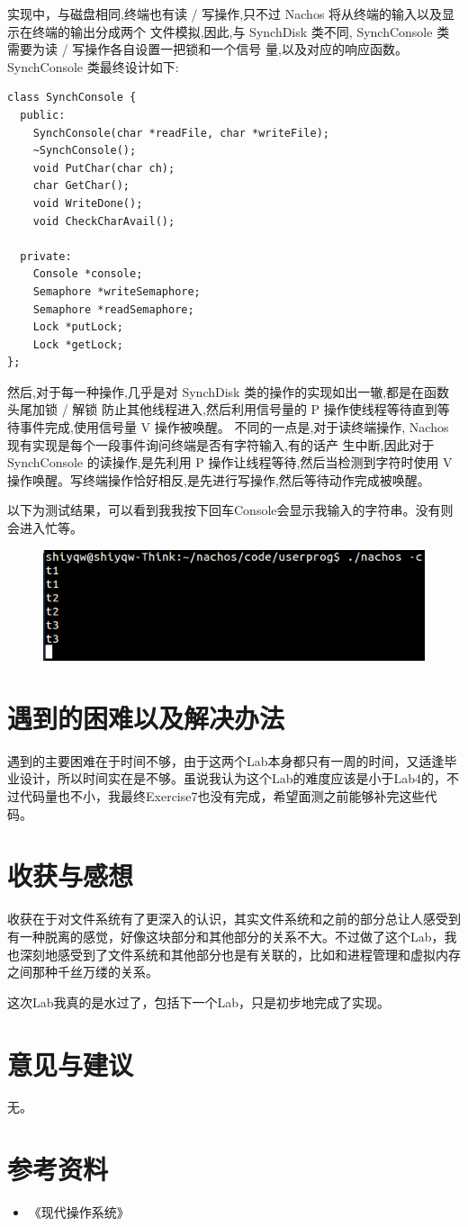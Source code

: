 \documentclass[nofonts]{ctexart}
\begin{document}
实现中，与磁盘相同,终端也有读 / 写操作,只不过 Nachos 将从终端的输入以及显示在终端的输出分成两个
文件模拟,因此,与 SynchDisk 类不同, SynchConsole 类需要为读 / 写操作各自设置一把锁和一个信号
量,以及对应的响应函数。 SynchConsole 类最终设计如下:
\begin{lstlisting}
class SynchConsole {
  public:
    SynchConsole(char *readFile, char *writeFile);
    ~SynchConsole();			
    void PutChar(char ch);	
    char GetChar();	   	
    void WriteDone();	 	
    void CheckCharAvail();

  private:
    Console *console;
    Semaphore *writeSemaphore;
    Semaphore *readSemaphore;
    Lock *putLock;
    Lock *getLock;
};

\end{lstlisting}
然后,对于每一种操作,几乎是对 SynchDisk 类的操作的实现如出一辙,都是在函数头尾加锁 / 解锁
防止其他线程进入,然后利用信号量的 P 操作使线程等待直到等待事件完成,使用信号量 V 操作被唤醒。
不同的一点是,对于读终端操作, Nachos 现有实现是每个一段事件询问终端是否有字符输入,有的话产
生中断,因此对于 SynchConsole 的读操作,是先利用 P 操作让线程等待,然后当检测到字符时使用 V
操作唤醒。写终端操作恰好相反,是先进行写操作,然后等待动作完成被唤醒。

以下为测试结果，可以看到我我按下回车Console会显示我输入的字符串。没有则会进入忙等。
\begin{figure}[h!]
\includegraphics[width=5in]{e6.png}
\end{figure}


\section{遇到的困难以及解决办法}
遇到的主要困难在于时间不够，由于这两个Lab本身都只有一周的时间，又适逢毕业设计，所以时间实在是不够。虽说我认为这个Lab的难度应该是小于Lab4的，不过代码量也不小，我最终Exercise7也没有完成，希望面测之前能够补完这些代码。

\section{收获与感想}

收获在于对文件系统有了更深入的认识，其实文件系统和之前的部分总让人感受到有一种脱离的感觉，好像这块部分和其他部分的关系不大。不过做了这个Lab，我也深刻地感受到了文件系统和其他部分也是有关联的，比如和进程管理和虚拟内存之间那种千丝万缕的关系。

这次Lab我真的是水过了，包括下一个Lab，只是初步地完成了实现。

\section{意见与建议}
无。

\section{参考资料}
\begin{itemize}
\item 《现代操作系统》
\end{itemize}
\end{document}
